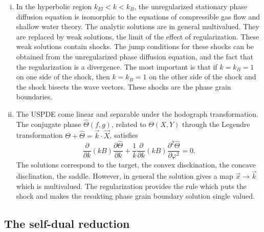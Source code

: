 \documentclass[12pt]{article}
\newcounter{solution}
\begin{document}
\begin{enumerate}[(i)]
    \item In the hyperbolic region $k_{El}<k<k_B$, the unregularized stationary phase diffusion equation is isomorphic to the equations of compressible gas flow and shallow water theory. The analytic solutions are in general multivalued. They are replaced by weak solutions, the limit of the effect of regularization. These weak solutions contain shocks. The jump conditions for these shocks can be obtained from the unregularized phase diffusion equation, and the fact that the regularization is a divergence. The most important is that if $k=k_B=1$ on one side of the shock, then $k=k_B=1$ on the other side of the shock and the shock bisects the wave vectors. These shocks are the phase grain boundaries.
    \item The USPDE come linear and separable under the hodograph transformation. The conjugate phase $\hat{\Theta}(f,g)$, related to $\Theta(X,Y)$ through the Legendre transformation $\Theta + \hat{\Theta} = \vec{k}\cdot\vec{X}$, satisfies
        \[
            \frac{\partial}{\partial k}(kB)\frac{\partial \hat{\Theta}}{\partial k} + \frac{1}{k}\frac{\partial}{\partial k}(kB)\frac{\partial^2 \hat{\Theta}}{\partial \varphi^2}=0.
        \]
    The solutions correspond to the target, the convex disckination, the concave disclination, the saddle. However, in general the solution gives a map $\vec{x} \rightarrow \vec{k}$ which is multivalued. The regularization provides the rule which puts the shock and makes the resukting phase grain boundary solution single valued. 
\end{enumerate}
\subsection{The self-dual reduction}
\end{document}
